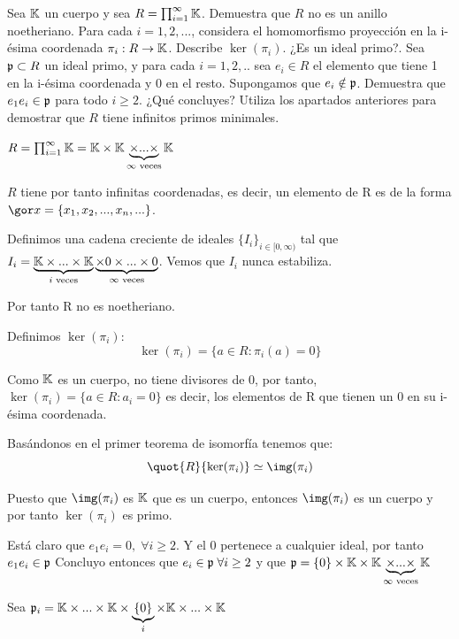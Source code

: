 \begin{problem}[2]
	Sea $\mathbb{K}$ un cuerpo y sea $R=\prod_{i=1}^{\infty} \mathbb{K}$.
	\ppart Demuestra que $R$ no es un anillo noetheriano.
	\ppart Para cada $i=1,2,...$, considera el homomorfismo proyección en la i-ésima coordenada $\pi_i:R \rightarrow \mathbb{K}$. Describe $\ker(\pi_i)$. ¿Es un ideal primo?.
	\ppart Sea $\mathfrak{p} \subset R$ un ideal primo, y para cada $i=1,2,..$ sea $e_i \in R$ el elemento que tiene 1 en la i-ésima coordenada y 0 en el resto. Supongamos que $e_i \notin \mathfrak{p}$. Demuestra que $e_1e_i \in \mathfrak{p}$ para todo $i \geq 2$. ¿Qué concluyes?
	\ppart Utiliza los apartados anteriores para demostrar que $R$ tiene infinitos primos minimales.

	\solution

	\spart
	$R=  \prod_{i=1}^{\infty} \mathbb{K} = \mathbb{K} \times \mathbb{K} \underbrace{\times... \times}_{\infty \text{ veces}} \mathbb{K}$

	$R$ tiene por tanto infinitas coordenadas, es decir, un elemento de R es de la forma $\cls{x}=\{x_1,x_2,...,x_n,...\}$.

	Definimos una cadena creciente de ideales $\{I_i\}_{i \in [0,\infty)}$ tal que $I_i = \underbrace{\mathbb{K} \times... \times \mathbb{K}}_{i\text{ veces}} \underbrace{\times 0 \times ...  \times 0}_{\infty \text{ veces}}$. Vemos que $I_i$ nunca estabiliza.

	Por tanto R no es noetheriano.


	\spart

	Definimos $\ker(\pi_i)$:
	$$ \ker(\pi_i)=\{ a \in R: \pi_i(a)=0 \} $$

	Como $\mathbb{K}$ es un cuerpo, no tiene divisores de 0, por tanto, $\ker(\pi_i) = \{ a \in R: a_i=0 \}$ es decir, los elementos de R que tienen un 0 en su i-ésima coordenada.

	Basándonos en el primer teorema de isomorfía tenemos que:
	$$\quot{R}{\ker(\pi_i)} \simeq \img(\pi_i)$$


	Puesto que  $\img(\pi_i)$ es $\mathbb{K}$ que es un cuerpo, entonces $\img(\pi_i)$ es un cuerpo y por tanto $\ker(\pi_i)$ es primo.

	\spart

	Está claro que $e_1e_i = 0, \; \forall i \geq 2$. Y el 0 pertenece a cualquier ideal, por tanto $e_1e_i \in \mathfrak{p}$ Concluyo entonces que $e_i \in \mathfrak{p} \; \forall i \geq 2$ y que $\mathfrak{p} = \{0\} \times \mathbb{K} \times \mathbb{K} \underbrace{\times... \times}_{\infty \text{ veces}} \mathbb{K}$

	\spart

	Sea $\mathfrak{p}_i =  \mathbb{K} \times ... \times \mathbb{K} \times \underbrace{\{0\}}_{i} \times \mathbb{K} \times ... \times \mathbb{K}$


\end{problem}
